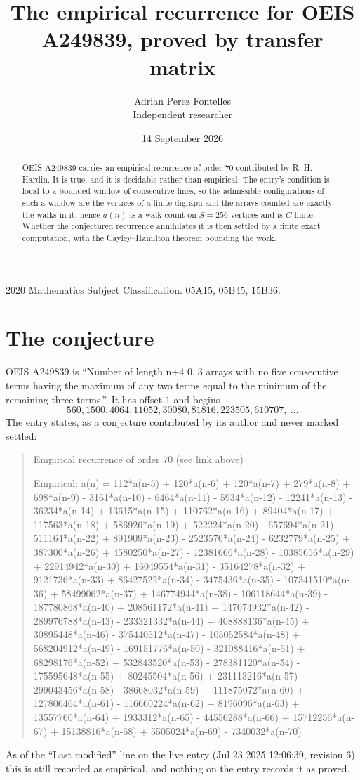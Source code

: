 \documentclass[11pt,a4paper]{article}
\title{The empirical recurrence for OEIS A249839, proved by transfer matrix}
\author{Adrian Perez Fontelles\\ \small Independent researcher}
\date{14 September 2026}
\theoremstyle{plain}
\theoremstyle{definition}
\begin{document}
\maketitle

\begin{abstract}
OEIS A249839 carries an empirical recurrence of order $70$ contributed by R. H. Hardin. It is
true, and it is decidable rather than empirical. The entry's condition is local to a bounded window of consecutive lines, so
the admissible configurations of such a window are the vertices of a finite digraph and the
arrays counted are exactly the walks in it; hence $a(n)$ is a walk count on $S=256$ vertices
and is $C$-finite. Whether the conjectured recurrence annihilates it is then settled by a
finite exact computation, with the Cayley--Hamilton theorem bounding the work.
\end{abstract}

\noindent\small 2020 Mathematics Subject Classification. 05A15, 05B45, 15B36.\normalsize

\section{The conjecture}

OEIS A249839 is ``Number of length n+4 0..3 arrays with no five consecutive terms having the maximum of any two terms equal to the minimum of the remaining three terms.''. It has offset $1$ and begins
\[
560, 1500, 4064, 11052, 30080, 81816, 223505, 610707,\ \dots
\]
The entry states, as a conjecture contributed by its author and never marked settled:
\begin{quote}\raggedright\small
Empirical recurrence of order 70 (see link above)

Empirical: a(n) = 112*a(n-5) + 120*a(n-6) + 120*a(n-7) + 279*a(n-8) + 698*a(n-9) - 3161*a(n-10) - 6464*a(n-11) - 5934*a(n-12) - 12241*a(n-13) - 36234*a(n-14) + 13615*a(n-15) + 110762*a(n-16) + 89404*a(n-17) + 117563*a(n-18) + 586926*a(n-19) + 522224*a(n-20) - 657694*a(n-21) - 511164*a(n-22) + 891909*a(n-23) - 2523576*a(n-24) - 6232779*a(n-25) + 387300*a(n-26) + 4580250*a(n-27) - 12381666*a(n-28) - 10385656*a(n-29) + 22914942*a(n-30) + 16049554*a(n-31) - 35164278*a(n-32) + 9121736*a(n-33) + 86427522*a(n-34) - 3475436*a(n-35) - 107341510*a(n-36) + 58499062*a(n-37) + 146774944*a(n-38) - 106118644*a(n-39) - 187780868*a(n-40) + 208561172*a(n-41) + 147074932*a(n-42) - 289976788*a(n-43) - 233321332*a(n-44) + 408888136*a(n-45) + 30895448*a(n-46) - 375440512*a(n-47) - 105052584*a(n-48) + 568204912*a(n-49) - 169151776*a(n-50) - 321088416*a(n-51) + 68298176*a(n-52) + 532843520*a(n-53) - 278381120*a(n-54) - 175595648*a(n-55) + 80245504*a(n-56) + 231113216*a(n-57) - 299043456*a(n-58) - 38668032*a(n-59) + 111875072*a(n-60) + 127806464*a(n-61) - 116660224*a(n-62) + 8196096*a(n-63) + 13557760*a(n-64) + 1933312*a(n-65) - 44556288*a(n-66) + 15712256*a(n-67) + 15138816*a(n-68) + 5505024*a(n-69) - 7340032*a(n-70)
\end{quote}
As of the ``Last modified'' line on the live entry (Jul 23 2025 12:06:39, revision 6) this is still
recorded as empirical, and nothing on the entry records it as proved.
\end{document}
